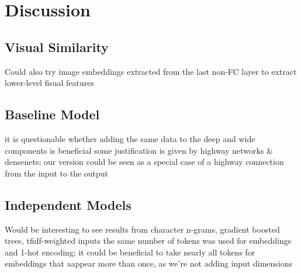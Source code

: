 \chapter{Discussion}

\section{Visual Similarity}

Could also try image embeddings extracted from the last non-FC layer to extract lower-level fisual features

\section{Baseline Model}

it is questionable whether adding the same data to the deep and wide components is beneficial
  some justification is given by highway networks \& densenets; our version could be seen as a special case of a highway connection from the input to the output

\section{Independent Models}

Would be interesting to see results from character n-grams, gradient boosted trees, tfidf-weighted inputs
the same number of tokens was used for embeddings and 1-hot encoding; it could be beneficial to take nearly all tokens for embeddings that aappear more than once, as we're not adding input dimensions
